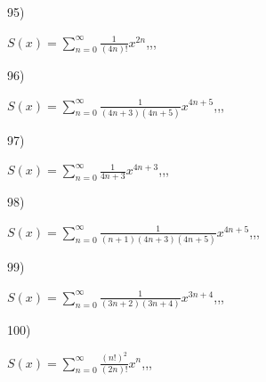 \documentclass[11pt, ukrainian]{article}
\begin{document}
\par
\vspace{0.9cm}
95) \space 
{%
{$S(x)=\sum\limits_{n=0}^{\infty}{\frac{1}{(4n)!}}{x^{{2n}}}$},,, \par \smallskip  
}
\par
\vspace{0.9cm}
96) \space 
{%
{$S(x)=\sum\limits_{n=0}^{\infty}{\frac{1}{(4n+3)(4n+5)}}{x^{{4n+5}}}$},,, \par \smallskip  
}
\par
\newpage
97) \space 
{%
{$S(x)=\sum\limits_{n=0}^{\infty}{\frac{1}{4n+3}}{x^{{4n+3}}}$},,, \par \smallskip  
}
\par
\vspace{0.9cm}
98) \space 
{%
{$S(x)=\sum\limits_{n=0}^{\infty}{\frac{1}{(n+1)(4n+3)(4n+5)}}{x^{{4n+5}}}$},,, \par \smallskip  
}
\par
\vspace{0.9cm}
99) \space 
{%
{$S(x)=\sum\limits_{n=0}^{\infty}{\frac{1}{(3n+2)(3n+4)}}{x^{{3n+4}}}$},,, \par \smallskip  
}
\par
\vspace{0.9cm}
100) \space 
{%
{$S(x)=\sum\limits_{n=0}^{\infty}{\frac{(n!)^2}{(2n)!}}{x^{{n}}}$},,, \par \smallskip  
}
\end{document}
